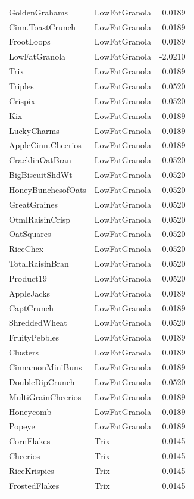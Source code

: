\begin{longtable}{llr}
GoldenGrahams & LowFatGranola & 0.0189 \\
Cinn.ToastCrunch & LowFatGranola & 0.0189 \\
FrootLoops & LowFatGranola & 0.0189 \\
LowFatGranola & LowFatGranola & -2.0210 \\
Trix & LowFatGranola & 0.0189 \\
Triples & LowFatGranola & 0.0520 \\
Crispix & LowFatGranola & 0.0520 \\
Kix & LowFatGranola & 0.0189 \\
LuckyCharms & LowFatGranola & 0.0189 \\
AppleCinn.Cheerios & LowFatGranola & 0.0189 \\
CracklinOatBran & LowFatGranola & 0.0520 \\
BigBiscuitShdWt & LowFatGranola & 0.0520 \\
HoneyBunchesofOats & LowFatGranola & 0.0520 \\
GreatGraines & LowFatGranola & 0.0520 \\
OtmlRaisinCrisp & LowFatGranola & 0.0520 \\
OatSquares & LowFatGranola & 0.0520 \\
RiceChex & LowFatGranola & 0.0520 \\
TotalRaisinBran & LowFatGranola & 0.0520 \\
Product19 & LowFatGranola & 0.0520 \\
AppleJacks & LowFatGranola & 0.0189 \\
CaptCrunch & LowFatGranola & 0.0189 \\
ShreddedWheat & LowFatGranola & 0.0520 \\
FruityPebbles & LowFatGranola & 0.0189 \\
Clusters & LowFatGranola & 0.0189 \\
CinnamonMiniBuns & LowFatGranola & 0.0189 \\
DoubleDipCrunch & LowFatGranola & 0.0520 \\
MultiGrainCheerios & LowFatGranola & 0.0189 \\
Honeycomb & LowFatGranola & 0.0189 \\
Popeye & LowFatGranola & 0.0189 \\
CornFlakes & Trix & 0.0145 \\
Cheerios & Trix & 0.0145 \\
RiceKrispies & Trix & 0.0145 \\
FrostedFlakes & Trix & 0.0145 \\

\end{longtable}
